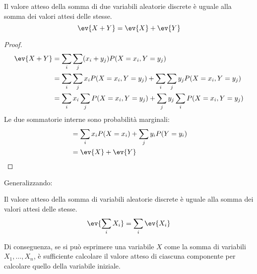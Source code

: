 \begin{prop}
	Il valore atteso della somma di due variabili aleatorie discrete è uguale alla somma dei valori attesi delle stesse.
	\begin{equation*}
		\ev{X+Y}=\ev{X}+\ev{Y}
	\end{equation*}
\end{prop}
\begin{proof}
	\begin{align*}
		\ev{X+Y} & = \sum_i\sum_j (x_i+y_j) P(X=x_i,Y=y_j)                               \\
		         & = \sum_i\sum_j x_i P(X=x_i,Y=y_j) + \sum_i\sum_j y_j P(X=x_i,Y=y_j)   \\
		         & = \sum_i x_i \sum_j P(X=x_i,Y=y_j) + \sum_j y_j \sum_i P(X=x_i,Y=y_j)
	\end{align*}
	Le due sommatorie interne sono probabilità marginali:
	\begin{align*}
		 & = \sum_i x_i P(X=x_i) + \sum_j y_i P(Y=y_i) \\
		 & = \ev{X} + \ev{Y}
	\end{align*}
\end{proof}

Generalizzando:
\begin{prop}
	Il valore atteso della somma di variabili aleatorie discrete è uguale alla somma dei valori attesi delle stesse.
	\begin{equation*}
		\ev{\sum_i X_i}=\sum_i \ev{X_i}
	\end{equation*}
\end{prop}

Di conseguenza, se si può esprimere una variabile $X$ come la somma di variabili $X_1,\dots,X_n$, è sufficiente calcolare il valore atteso di ciascuna componente per calcolare quello della variabile iniziale.


